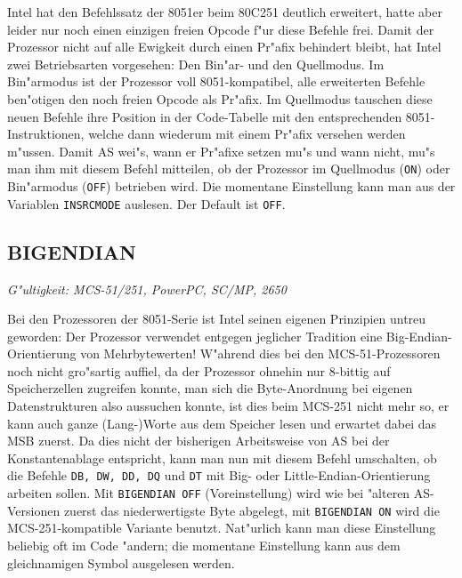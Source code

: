 \documentclass[12pt,a4paper,twoside]{report}
\makeatletter
\newcommand{\tty}[1]{{\tt #1}}
\newcommand{\ttindex}[1]{\index{#1@{\tt #1}}}
\makeatother
\begin{document}
Intel hat den Befehlssatz der 8051er beim 80C251 deutlich erweitert,
hatte aber leider nur noch einen einzigen freien Opcode f"ur diese
Befehle frei.  Damit der Prozessor nicht auf alle Ewigkeit durch
einen Pr"afix behindert bleibt, hat Intel zwei Betriebsarten vorgesehen:
Den Bin"ar- und den Quellmodus.  Im Bin"armodus ist der Prozessor voll
8051-kompatibel, alle erweiterten Befehle ben"otigen den noch freien
Opcode als Pr"afix.  Im Quellmodus tauschen diese neuen Befehle ihre
Position in der Code-Tabelle mit den entsprechenden 8051-Instruktionen,
welche dann wiederum mit einem Pr"afix versehen werden m"ussen.
Damit AS wei"s, wann er Pr"afixe setzen mu"s und wann nicht, mu"s man
ihm mit diesem Befehl mitteilen, ob der Prozessor im Quellmodus (\tty{ON})
oder Bin"armodus (\tty{OFF}) betrieben wird.  Die momentane Einstellung
kann man aus der Variablen \tty{INSRCMODE} auslesen.  Der Default ist
\tty{OFF}.


\subsection{BIGENDIAN}
\ttindex{ENDIAN}\ttindex{BIGENDIAN}\label{SectBIGENDIAN}

{\em G"ultigkeit: MCS-51/251, PowerPC, SC/MP, 2650}

Bei den Prozessoren der 8051-Serie ist Intel seinen eigenen Prinzipien
untreu geworden: Der Prozessor verwendet entgegen jeglicher Tradition
eine Big-Endian-Orientierung von Mehrbytewerten!  W"ahrend dies bei
den MCS-51-Prozessoren noch nicht gro"sartig auffiel, da der Prozessor
ohnehin nur 8-bittig auf Speicherzellen zugreifen konnte, man sich die
Byte-Anordnung bei eigenen Datenstrukturen also aussuchen konnte, ist
dies beim MCS-251 nicht mehr so, er kann auch ganze (Lang-)Worte aus
dem Speicher lesen und erwartet dabei das MSB zuerst.  Da dies nicht der
bisherigen Arbeitsweise von AS bei der Konstantenablage entspricht,
kann man nun mit diesem Befehl umschalten, ob die Befehle \tty{DB, DW, DD,
DQ} und \tty{DT} mit Big- oder Little-Endian-Orientierung arbeiten sollen.
Mit \tty{BIGENDIAN OFF} (Voreinstellung) wird wie bei "alteren AS-Versionen
zuerst das niederwertigste Byte abgelegt, mit \tty{BIGENDIAN ON} wird die
MCS-251-kompatible Variante benutzt.  Nat"urlich kann man diese Einstellung
beliebig oft im Code "andern; die momentane Einstellung kann aus dem
gleichnamigen Symbol ausgelesen werden.
\end{document}
